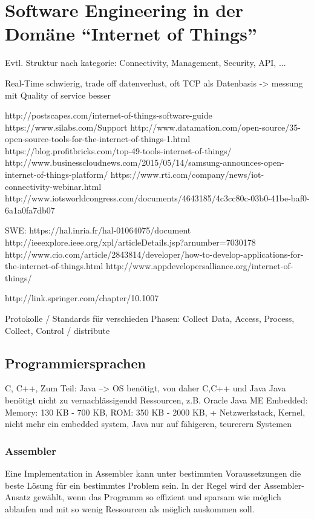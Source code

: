 \chapter{Software Engineering in der Domäne "`Internet of Things"'}


Evtl. Struktur nach kategorie: Connectivity, Management, Security, API, ...

Real-Time schwierig, trade off datenverlust, oft TCP als Datenbasis -> messung mit Quality of service besser

http://postscapes.com/internet-of-things-software-guide
https://www.silabs.com/Support%
http://www.datamation.com/open-source/35-open-source-tools-for-the-internet-of-things-1.html
https://blog.profitbricks.com/top-49-tools-internet-of-things/
http://www.businesscloudnews.com/2015/05/14/samsung-announces-open-internet-of-things-platform/
https://www.rti.com/company/news/iot-connectivity-webinar.html
http://www.iotsworldcongress.com/documents/4643185/4c3cc80c-03b0-41be-baf0-6a1a0fa7db07


SWE:
https://hal.inria.fr/hal-01064075/document
http://ieeexplore.ieee.org/xpl/articleDetails.jsp?arnumber=7030178
http://www.cio.com/article/2843814/developer/how-to-develop-applications-for-the-internet-of-things.html
http://www.appdevelopersalliance.org/internet-of-things/

http://link.springer.com/chapter/10.1007%


Protokolle / Standards für verschieden Phasen: Collect Data, Access, Process, Collect, Control / distribute

\section{Programmiersprachen}

C, C++, Zum Teil: Java --> OS benötigt, von daher C,C++ und Java
Java benötigt nicht zu vernachlässigendd Ressourcen, z.B. Oracle Java ME Embedded: Memory: 130 KB - 700 KB, ROM: 350 KB - 2000 KB, + Netzwerkstack, Kernel, nicht mehr ein embedded system, Java nur auf fähigeren, teurerern Systemen

\subsection{Assembler}
Eine Implementation in Assembler kann unter bestimmten Voraussetzungen die beste Lösung für ein bestimmtes Problem sein. In der Regel wird der Assembler-Ansatz gewählt, wenn das Programm so effizient und sparsam wie möglich ablaufen und mit so wenig Ressourcen als möglich auskommen soll.



